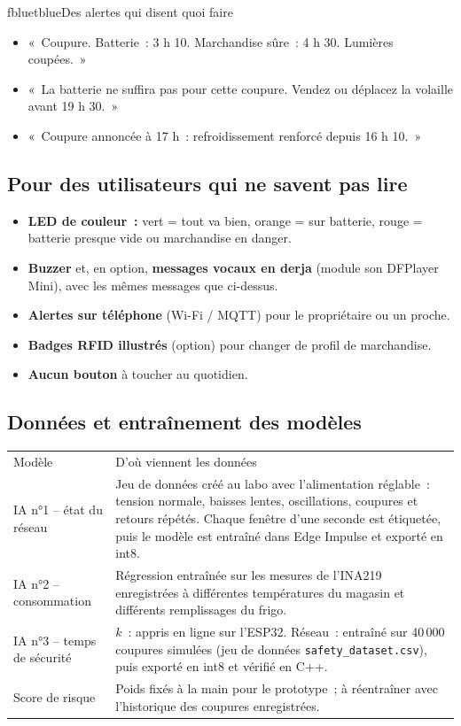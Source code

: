 \documentclass[10pt,a4paper]{article}
\begin{document}
\begin{tbox}{fblue}{tblue}{Des alertes qui disent quoi faire}
\begin{itemize}[nosep]
  \item «~Coupure. Batterie~: 3 h 10. Marchandise sûre~: 4 h 30. Lumières coupées.~»
  \item «~La batterie ne suffira pas pour cette coupure. Vendez ou déplacez la volaille avant 19 h 30.~»
  \item «~Coupure annoncée à 17 h~: refroidissement renforcé depuis 16 h 10.~»
\end{itemize}
\end{tbox}

\subsection{Pour des utilisateurs qui ne savent pas lire}
\begin{itemize}
  \item \textbf{LED de couleur~:} vert = tout va bien, orange = sur batterie, rouge = batterie presque vide ou marchandise en danger.
  \item \textbf{Buzzer} et, en option, \textbf{messages vocaux en derja} (module son DFPlayer Mini), avec les mêmes messages que ci-dessus.
  \item \textbf{Alertes sur téléphone} (Wi-Fi / MQTT) pour le propriétaire ou un proche.
  \item \textbf{Badges RFID illustrés} (option) pour changer de profil de marchandise.
  \item \textbf{Aucun bouton} à toucher au quotidien.
\end{itemize}

\subsection{Données et entraînement des modèles}
\begin{tabularx}{\linewidth}{Q{4cm}L}
 Modèle & \mdseries D'où viennent les données \\
IA n°1 -- état du réseau & Jeu de données créé au labo avec l'alimentation réglable~: tension normale, baisses lentes, oscillations, coupures et retours répétés. Chaque fenêtre d'une seconde est étiquetée, puis le modèle est entraîné dans Edge Impulse et exporté en int8. \\
IA n°2 -- consommation & Régression entraînée sur les mesures de l'INA219 enregistrées à différentes températures du magasin et différents remplissages du frigo. \\
IA n°3 -- temps de sécurité & $k$~: appris en ligne sur l'ESP32. Réseau~: entraîné sur 40\,000 coupures simulées (jeu de données \texttt{safety\_dataset.csv}), puis exporté en int8 et vérifié en C++. \\
Score de risque & Poids fixés à la main pour le prototype~; à réentraîner avec l'historique des coupures enregistrées. \\
\end{tabularx}
\end{document}
